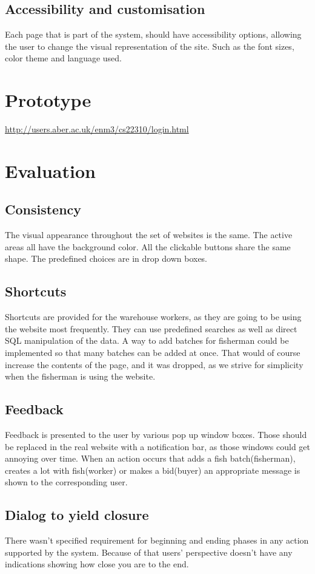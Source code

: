 \documentclass[a4paper]{article}
\begin{document}
\subsection{Accessibility and customisation}
Each page that is part of the system, should have accessibility options, allowing the user to change the visual representation of the site. Such as the font sizes, color theme and language used.
\section{Prototype}
\url{http://users.aber.ac.uk/enm3/cs22310/login.html}
\section{Evaluation}
\subsection{Consistency}
The visual appearance throughout the set of websites is the same. The active areas all have the background color. All the clickable buttons share the same shape. The predefined choices are in drop down boxes. 
\subsection{Shortcuts}
Shortcuts are provided for the warehouse workers, as they are going to be using the website most frequently. They can use predefined searches as well as direct SQL manipulation of the data. A way to add batches for fisherman could be implemented so that many batches can be added at once. That would of course increase the contents of the page, and it was dropped, as we strive for simplicity when the fisherman is using the website.
\subsection{Feedback}
Feedback is presented to the user by various pop up window boxes. Those should be replaced in the real website with a notification bar, as those windows could get annoying over time. When an action occurs that adds a fish batch(fisherman), creates a lot with fish(worker) or makes a bid(buyer)  an appropriate message is shown to the corresponding user. 
\subsection{Dialog to yield closure}
There wasn't specified requirement for beginning and ending phases in any action supported by the system. Because of that  users' perspective doesn't have any indications showing how close you are to the end.
\end{document}
